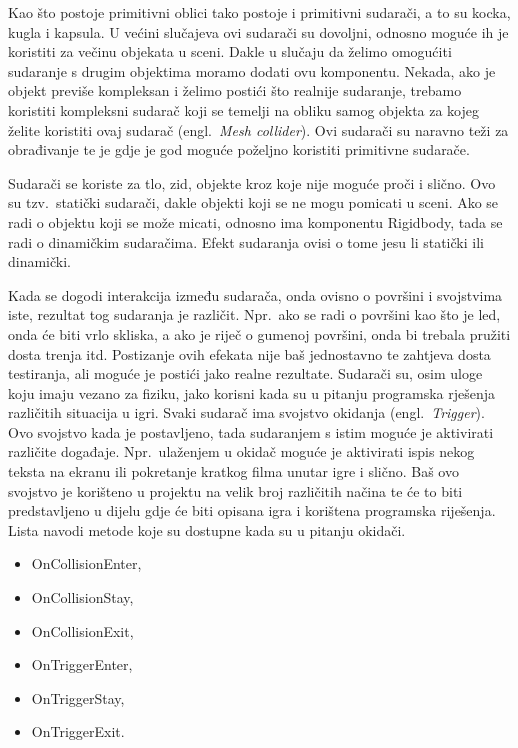 Kao što postoje primitivni oblici tako postoje i primitivni sudarači, a to su kocka, kugla i kapsula. U većini slučajeva ovi sudarači su dovoljni, odnosno moguće ih je koristiti za večinu objekata u sceni. Dakle u slučaju da želimo omogućiti sudaranje s drugim objektima moramo dodati ovu komponentu. Nekada, ako je objekt previše kompleksan i želimo postići što realnije sudaranje, trebamo koristiti kompleksni sudarač koji se temelji na obliku samog objekta za kojeg želite koristiti ovaj sudarač (engl.~\textit{Mesh collider}). Ovi sudarači su naravno teži za obrađivanje te je gdje je god moguće poželjno koristiti primitivne sudarače.

Sudarači se koriste za tlo, zid, objekte kroz koje nije moguće proči i slično. Ovo su tzv.~statički sudarači, dakle objekti koji se ne mogu pomicati u sceni. Ako se radi o objektu koji se može micati, odnosno ima komponentu Rigidbody, tada se radi o dinamičkim sudaračima. Efekt sudaranja ovisi o tome jesu li statički ili dinamički.

Kada se dogodi interakcija između sudarača, onda ovisno o površini i svojstvima iste, rezultat tog sudaranja je različit. Npr.~ako se radi o površini kao što je led, onda će biti vrlo skliska, a ako je riječ o gumenoj površini, onda bi trebala pružiti dosta trenja itd. Postizanje ovih efekata nije baš jednostavno te zahtjeva dosta testiranja, ali moguće je postići jako realne rezultate. 
Sudarači su, osim uloge koju imaju vezano za fiziku, jako korisni kada su u pitanju programska rješenja različitih situacija u igri. Svaki sudarač ima svojstvo okidanja (engl.~\textit{Trigger}). Ovo svojstvo kada je postavljeno, tada sudaranjem s istim moguće je aktivirati različite događaje. Npr.~ulaženjem u okidač moguće je aktivirati ispis nekog teksta na ekranu ili pokretanje kratkog filma unutar igre i slično. Baš ovo svojstvo je korišteno u projektu na velik broj različitih načina te će to biti predstavljeno u dijelu gdje će biti opisana igra i korištena programska riješenja.
Lista navodi metode koje su dostupne kada su u pitanju okidači.
\begin{itemize}
  \item OnCollisionEnter,
  \item OnCollisionStay,
  \item OnCollisionExit,
  \item OnTriggerEnter,
  \item OnTriggerStay,
  \item OnTriggerExit.
\end{itemize}

